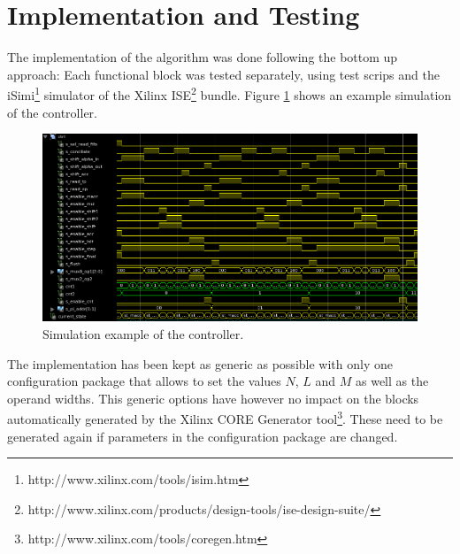 \documentclass[mscthesis]{usiinfthesis}
\begin{document}
\section{Implementation and Testing}

The implementation of the algorithm was done following the bottom up
approach: Each functional block was tested separately, using test scrips
and the iSimi\footnote{http://www.xilinx.com/tools/isim.htm} simulator of the
Xilinx
ISE\footnote{http://www.xilinx.com/products/design-tools/ise-design-suite/}
bundle. Figure \ref{fig:test_ctrl} shows an example simulation of the
controller.

\begin{figure}
    \includegraphics[width=1\columnwidth]{./schema/test_ctrl.png}
    \caption{Simulation example of the controller.}
    \label{fig:test_ctrl}
\end{figure}

The implementation has been kept as generic as possible with only one
configuration package that allows to set the values $N$, $L$ and $M$ as well as
the operand widths. This generic options have however no impact on the blocks
automatically generated by the Xilinx CORE Generator
tool\footnote{http://www.xilinx.com/tools/coregen.htm}. These need to be
generated again if parameters in the configuration package are changed.
\end{document}
